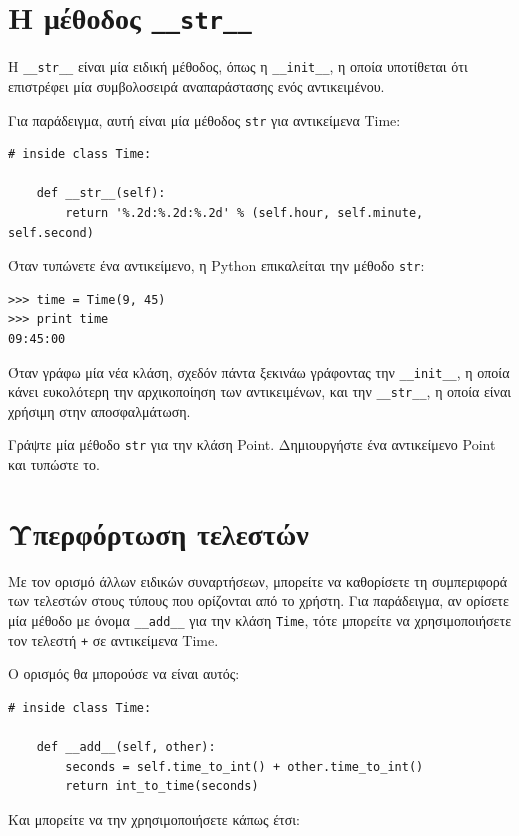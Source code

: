 \documentclass[10pt]{book}
\begin{document}
\section{Η μέθοδος {\tt \_\_str\_\_}}

H \verb"__str__" είναι μία ειδική μέθοδος, όπως η \verb"__init__", η οποία υποτίθεται ότι επιστρέφει
μία συμβολοσειρά αναπαράστασης ενός αντικειμένου.

Για παράδειγμα, αυτή είναι μία μέθοδος {\tt str} για αντικείμενα Time:

\begin{verbatim}
# inside class Time:

    def __str__(self):
        return '%.2d:%.2d:%.2d' % (self.hour, self.minute, self.second)
\end{verbatim}
%
Όταν τυπώνετε ένα αντικείμενο, η Python επικαλείται την μέθοδο {\tt str}:

\begin{verbatim}
>>> time = Time(9, 45)
>>> print time
09:45:00
\end{verbatim}
%
Όταν γράφω μία νέα κλάση, σχεδόν πάντα ξεκινάω γράφοντας την \verb"__init__", η οποία κάνει ευκολότερη
την αρχικοποίηση των αντικειμένων, και την \verb"__str__", η οποία είναι χρήσιμη στην αποσφαλμάτωση.
\\

\begin{exercise}

Γράψτε μία μέθοδο {\tt str} για την κλάση Point. Δημιουργήστε ένα αντικείμενο Point και τυπώστε το.
\end{exercise}


\section{Υπερφόρτωση τελεστών}
\label{operator.overloading}

Με τον ορισμό άλλων ειδικών συναρτήσεων, μπορείτε να καθορίσετε τη συμπεριφορά των τελεστών στους τύπους
που ορίζονται από το χρήστη. Για παράδειγμα, αν ορίσετε μία μέθοδο με όνομα \verb"__add__" για την κλάση
{\tt Time}, τότε μπορείτε να χρησιμοποιήσετε τον τελεστή {\tt +} σε αντικείμενα Time.

Ο ορισμός θα μπορούσε να είναι αυτός:

\begin{verbatim}
# inside class Time:

    def __add__(self, other):
        seconds = self.time_to_int() + other.time_to_int()
        return int_to_time(seconds)
\end{verbatim}
%
Και μπορείτε να την χρησιμοποιήσετε κάπως έτσι:
\end{document}
